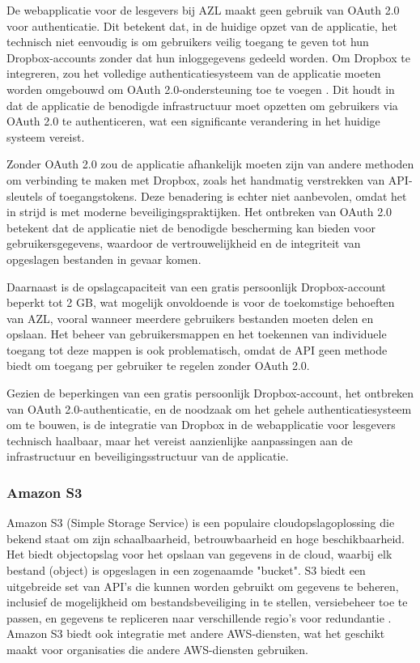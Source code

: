 De webapplicatie voor de lesgevers bij AZL maakt geen gebruik van OAuth 2.0 voor authenticatie. Dit betekent dat, in de huidige opzet van de applicatie, 
het technisch niet eenvoudig is om gebruikers veilig toegang te geven tot hun Dropbox-accounts zonder dat hun inloggegevens gedeeld worden. Om Dropbox te 
integreren, zou het volledige authenticatiesysteem van de applicatie moeten worden omgebouwd om OAuth 2.0-ondersteuning toe te voegen \autocite{dropbox_oauth}. Dit houdt in dat de 
applicatie de benodigde infrastructuur moet opzetten om gebruikers via OAuth 2.0 te authenticeren, wat een significante verandering in het huidige systeem vereist.

Zonder OAuth 2.0 zou de applicatie afhankelijk moeten zijn van andere methoden om verbinding te maken met Dropbox, zoals het handmatig verstrekken van API-sleutels 
of toegangstokens. Deze benadering is echter niet aanbevolen, omdat het in strijd is met moderne beveiligingspraktijken. Het ontbreken van OAuth 2.0 betekent 
dat de applicatie niet de benodigde bescherming kan bieden voor gebruikersgegevens, waardoor de vertrouwelijkheid en de integriteit van opgeslagen bestanden 
in gevaar komen.

Daarnaast is de opslagcapaciteit van een gratis persoonlijk Dropbox-account beperkt tot 2 GB, wat mogelijk onvoldoende is voor de toekomstige behoeften van AZL, 
vooral wanneer meerdere gebruikers bestanden moeten delen en opslaan. Het beheer van gebruikersmappen en het toekennen van individuele toegang tot deze 
mappen is ook problematisch, omdat de API geen methode biedt om toegang per gebruiker te regelen zonder OAuth 2.0.

Gezien de beperkingen van een gratis persoonlijk Dropbox-account, het ontbreken van OAuth 2.0-authenticatie, en de noodzaak om het gehele authenticatiesysteem 
om te bouwen, is de integratie van Dropbox in de webapplicatie voor lesgevers technisch haalbaar, maar het vereist aanzienlijke aanpassingen aan de infrastructuur 
en beveiligingsstructuur van de applicatie.

\subsubsection{Amazon S3}
Amazon S3 (Simple Storage Service) is een populaire cloudopslagoplossing die bekend staat om zijn schaalbaarheid, betrouwbaarheid en hoge beschikbaarheid. Het biedt objectopslag voor het opslaan van gegevens in de cloud, waarbij elk bestand (object) is opgeslagen in een zogenaamde "bucket". S3 biedt een uitgebreide set van API's die kunnen worden gebruikt om gegevens te beheren, inclusief de mogelijkheid om bestandsbeveiliging in te stellen, versiebeheer toe te passen, en gegevens te repliceren naar verschillende regio's voor redundantie \autocite{aws_s3}. Amazon S3 biedt ook integratie met andere AWS-diensten, wat het geschikt maakt voor organisaties die andere AWS-diensten gebruiken.

